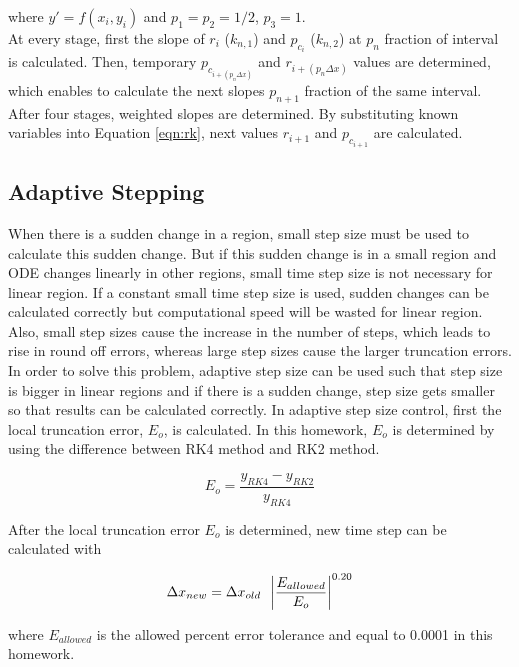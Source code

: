 \documentclass[letterpaper,12pt]{article}
\begin{document}
where $y\prime = f(x_i,y_i)$ and $p_1=p_2=1/2$, $p_3=1$.\\
At every stage, first the slope of $r_i$ ($k_{n,1}$) and  $p_{c_{i}}$ ($k_{n,2}$) at $p_n$ fraction of interval is calculated. 
Then, temporary $p_{c_{i+(p_n\Delta x)}}$ and $r_{i+(p_n\Delta x)}$ values are determined, which enables to calculate the next 
slopes $p_{n+1}$ fraction of the same interval. After four stages, weighted slopes are determined. By substituting known 
variables into Equation \ref{eqn:rk}, next values $r_{i+1}$ and $p_{c_{i+1}}$ are calculated. 
\subsection{Adaptive Stepping}
\label{section:adaptive}

When there is a sudden change in a region, small step size must be used to calculate this sudden change. 
But if this sudden change is in a small region and ODE changes linearly in other regions, small time step size
is not necessary for linear region. If a constant small time step size is used, sudden changes can be calculated correctly but 
computational speed will be wasted for linear region. 
Also, small step sizes cause the increase in the number of steps, which leads to
rise in round off errors, whereas large step sizes cause the larger truncation errors. 
In order to solve this problem, adaptive step size 
can be used such that step size is bigger in linear regions and if there is a sudden change, step size gets
smaller so that results can be calculated correctly. 
In adaptive step size control, first the local truncation error, $E_o$, is calculated. In this 
homework, $E_o$ is determined by using the difference between RK4 method and RK2 method.

\begin{equation}
	E_o = \frac{y_{RK4}-y_{RK2}}{y_{RK4}}
\end{equation}

After the local truncation error $E_o$ is determined, 
new time step can be calculated with 

\begin{equation}
	\Delta x_{new} = \Delta x_{old} \hspace{0.5em} \left| \frac{E_{allowed}}{E_o}\right|^{0.20}
\end{equation}

where $E_{allowed}$ is the allowed percent error tolerance and equal to 0.0001 in this homework.

\newpage
\end{document}
